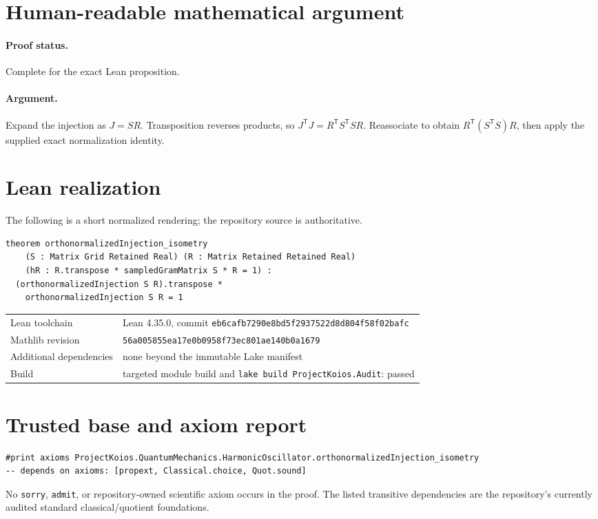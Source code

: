 \documentclass[11pt]{article}
\begin{document}
\section{Human-readable mathematical argument}
\paragraph{Proof status.} Complete for the exact Lean proposition.
\paragraph{Argument.} Expand the injection as $J=SR$.  Transposition reverses products, so $J^{\mathsf T}J=R^{\mathsf T}S^{\mathsf T}SR$.  Reassociate to obtain $R^{\mathsf T}(S^{\mathsf T}S)R$, then apply the supplied exact normalization identity.

\section{Lean realization}
The following is a short normalized rendering; the repository source is authoritative.
\begin{lstlisting}
theorem orthonormalizedInjection_isometry
    (S : Matrix Grid Retained Real) (R : Matrix Retained Retained Real)
    (hR : R.transpose * sampledGramMatrix S * R = 1) :
  (orthonormalizedInjection S R).transpose *
    orthonormalizedInjection S R = 1
\end{lstlisting}
\begin{tabularx}{\textwidth}{@{}lY@{}}\toprule
Lean toolchain & Lean 4.35.0, commit \texttt{eb6cafb7290e8bd5f2937522d8d804f58f02bafc} \\
Mathlib revision & \texttt{56a005855ea17e0b0958f73ec801ae140b0a1679} \\
Additional dependencies & none beyond the immutable Lake manifest \\
Build & targeted module build and \texttt{lake build ProjectKoios.Audit}: passed \\
\bottomrule\end{tabularx}

\section{Trusted base and axiom report}
\begin{lstlisting}
#print axioms ProjectKoios.QuantumMechanics.HarmonicOscillator.orthonormalizedInjection_isometry
-- depends on axioms: [propext, Classical.choice, Quot.sound]
\end{lstlisting}
No \texttt{sorry}, \texttt{admit}, or repository-owned scientific axiom occurs in the
proof. The listed transitive dependencies are the repository's currently audited standard
classical/quotient foundations.
\end{document}

